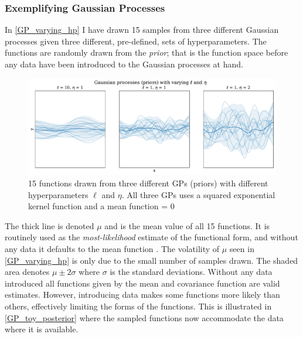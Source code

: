 \documentclass[a4paper]{article}
\begin{document}
\subsubsection{Exemplifying Gaussian Processes}

In \autoref{GP_varying_hp} I have drawn 15 samples from three different Gaussian processes given three different, pre-defined, sets of hyperparameters. The functions are randomly drawn from the \emph{prior}; that is the function space before any data have been introduced to the Gaussian processes at hand.\par

\begin{figure}[!htb]
	\centering
	\includegraphics[scale=0.47]{GP_varying_hp.pdf}
    \caption{\footnotesize{15 functions drawn from three different GPs (priors) with different hyperparameters $\ell$ and $\eta$. All three GPs uses a squared exponential kernel function and a mean function = 0}}\label{GP_varying_hp}
\end{figure}

The thick line is denoted $\mu$ and is the mean value of all 15 functions. It is routinely used as the \emph{most-likelihood} estimate of the functional form, and without any data it defaults to the mean function \cite[3]{williams2006gaussian}. The volatility of $\mu$ seen in \autoref{GP_varying_hp} is only due to the small number of samples drawn. The shaded area denotes $\mu \pm 2\sigma$ where $\sigma$ is the standard deviations. Without any data introduced all functions given by the mean and covariance function are valid estimates. However, introducing data makes some functions more likely than others, effectively limiting the forms of the functions. This is illustrated in \autoref{GP_toy_posterior} where the sampled functions now accommodate the data where it is available.\par  
\end{document}
